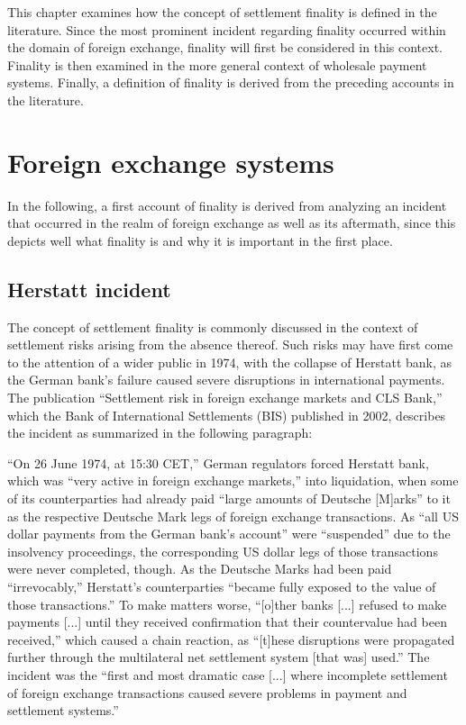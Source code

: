 This chapter examines how the concept of settlement finality is defined in the literature.
Since the most prominent incident regarding finality occurred within the domain of foreign exchange, finality will first be considered in this context.
Finality is then examined in the more general context of wholesale payment systems.
Finally, a definition of finality is derived from the preceding accounts in the literature.

\section{Foreign exchange systems}

In the following, a first account of finality is derived from analyzing an incident that occurred in the realm of foreign exchange as well as its aftermath, since this depicts well what finality is and why it is important in the first place.

\subsection{Herstatt incident}

The concept of settlement finality is commonly discussed in the context of settlement risks arising from the absence thereof.
Such risks may have first come to the attention of a wider public in 1974, with the collapse of Herstatt bank, as the German bank's failure caused severe disruptions in international payments.
The publication ``Settlement risk in foreign exchange markets and CLS Bank,'' \autocite{galati2002} which the Bank of International Settlements (BIS) published in 2002, describes the incident as summarized in the following paragraph: \autocite[55, 56]{galati2002}

``On 26 June 1974, at 15:30 CET,'' German regulators forced Herstatt bank, which was ``very active in foreign exchange markets,'' into liquidation, when some of its counterparties had already paid ``large amounts of Deutsche [M]arks'' to it as the respective Deutsche Mark legs of foreign exchange transactions.
As ``all US dollar payments from the German bank's account'' were ``suspended'' due to the insolvency proceedings, the corresponding US dollar legs of those transactions were never completed, though.
As the Deutsche Marks had been paid ``irrevocably,'' Herstatt's counterparties ``became fully exposed to the value of those transactions.''
To make matters worse, ``[o]ther banks [...] refused to make payments [...] until they received confirmation that their countervalue had been received,'' which caused a chain reaction, as ``[t]hese disruptions were propagated further through the multilateral net settlement system [that was] used.''
The incident was the ``first and most dramatic case [...] where incomplete settlement of foreign exchange transactions caused severe problems in payment and settlement systems.''

